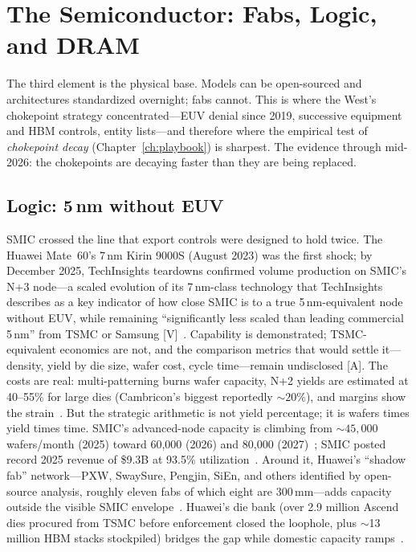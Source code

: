 \chapter{The Semiconductor: Fabs, Logic, and DRAM}
\label{ch:semi}

The third element is the physical base. Models can be open-sourced and architectures standardized overnight; fabs cannot. This is where the West's chokepoint strategy concentrated---EUV denial since 2019, successive equipment and HBM controls, entity lists---and therefore where the empirical test of \emph{chokepoint decay} (Chapter~\ref{ch:playbook}) is sharpest. The evidence through mid-2026: the chokepoints are decaying faster than they are being replaced.

\section{Logic: 5\,nm without EUV}

SMIC crossed the line that export controls were designed to hold twice. The Huawei Mate~60's 7\,nm Kirin 9000S (August 2023) was the first shock; by December 2025, TechInsights teardowns confirmed volume production on SMIC's N+3 node---a scaled evolution of its 7\,nm-class technology that TechInsights describes as a key indicator of how close SMIC is to a true 5\,nm-equivalent node without EUV, while remaining ``significantly less scaled than leading commercial 5\,nm'' from TSMC or Samsung [V]~\cite{smic-5nm,techinsights-n3}. Capability is demonstrated; TSMC-equivalent economics are not, and the comparison metrics that would settle it---density, yield by die size, wafer cost, cycle time---remain undisclosed [A]. The costs are real: multi-patterning burns wafer capacity, N+2 yields are estimated at 40--55\% for large dies (Cambricon's biggest reportedly ${\sim}20\%$), and margins show the strain~\cite{yields,cambricon}. But the strategic arithmetic is not yield percentage; it is wafers times yield times time. SMIC's advanced-node capacity is climbing from ${\sim}45{,}000$ wafers/month (2025) toward 60,000 (2026) and 80,000 (2027)~\cite{semianalysis-ascend}; SMIC posted record 2025 revenue of \$9.3B at 93.5\% utilization~\cite{smic-2025}. Around it, Huawei's ``shadow fab'' network---PXW, SwaySure, Pengjin, SiEn, and others identified by open-source analysis, roughly eleven fabs of which eight are 300\,mm---adds capacity outside the visible SMIC envelope~\cite{shadow-fabs}. Huawei's die bank (over 2.9 million Ascend dies procured from TSMC before enforcement closed the loophole, plus $\sim$13 million HBM stacks stockpiled) bridges the gap while domestic capacity ramps~\cite{semianalysis-ascend}.

